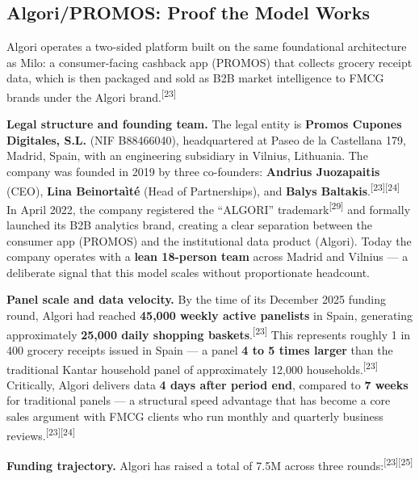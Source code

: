 \documentclass[11pt,a4paper]{article}
\begin{document}
\subsection{Algori/PROMOS: Proof the Model Works}

Algori operates a two-sided platform built on the same foundational architecture as Milo: a consumer-facing cashback app (PROMOS) that collects grocery receipt data, which is then packaged and sold as B2B market intelligence to FMCG brands under the Algori brand.\textsuperscript{[23]}

\textbf{Legal structure and founding team.} The legal entity is \textbf{Promos Cupones Digitales, S.L.} (NIF B88466040), headquartered at Paseo de la Castellana 179, Madrid, Spain, with an engineering subsidiary in Vilnius, Lithuania. The company was founded in 2019 by three co-founders: \textbf{Andrius Juozapaitis} (CEO), \textbf{Lina Beinorta\`{i}t\'{e}} (Head of Partnerships), and \textbf{Balys Baltakis}.\textsuperscript{[23][24]} In April 2022, the company registered the ``ALGORI'' trademark\textsuperscript{[29]} and formally launched its B2B analytics brand, creating a clear separation between the consumer app (PROMOS) and the institutional data product (Algori). Today the company operates with a \textbf{lean 18-person team} across Madrid and Vilnius --- a deliberate signal that this model scales without proportionate headcount.

\textbf{Panel scale and data velocity.} By the time of its December 2025 funding round, Algori had reached \textbf{45,000 weekly active panelists} in Spain, generating approximately \textbf{25,000 daily shopping baskets}.\textsuperscript{[23]} This represents roughly 1 in 400 grocery receipts issued in Spain --- a panel \textbf{4 to 5 times larger} than the traditional Kantar household panel of approximately 12,000 households.\textsuperscript{[23]} Critically, Algori delivers data \textbf{4 days after period end}, compared to \textbf{7 weeks} for traditional panels --- a structural speed advantage that has become a core sales argument with FMCG clients who run monthly and quarterly business reviews.\textsuperscript{[23][24]}

\textbf{Funding trajectory.} Algori has raised a total of \texteuro{}7.5M across three rounds:\textsuperscript{[23][25]}
\end{document}

